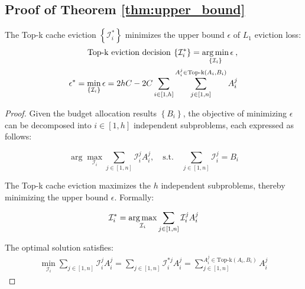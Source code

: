 \subsection{Proof of Theorem \ref{thm:upper_bound}}
\label{apdx:proof_upper_bound}
\begin{theorem}
	 The Top-k cache eviction $\left\{ \mathcal{I}^*_i \right\}$ minimizes the upper bound $\epsilon$ of $L_1$ eviction loss:
	{
		\begin{align}
			\text{Top-k eviction decision} \:	\left\{ \mathcal{I}^*_i \right\} = \operatorname*{arg\,min}_{\left\{ \mathcal{I}_i \right\}} \epsilon  \: ,\\ \epsilon^*= \min_{\left\{ \mathcal{I}_i \right\}} \epsilon = 2hC - 2C\sum_{i\in [1, h]}\sum_{j \in [1,n]}^{A_i^j \in \text{Top-k}(A_i,B_i)} A_i^j 
		\end{align}
	}
\end{theorem}
\begin{proof}
	Given the budget allocation results $\left\{B_i\right\}$, the objective of minimizing $\epsilon$ can be decomposed into $i \in [1, h]$ independent subproblems, each expressed as follows:
	
	\begin{equation}
		\arg\max_{\mathcal{I}_i} \sum_{j \in [1,n]} \mathcal{I}_i^j A_i^j, \quad \text{s.t.} \quad \sum_{j \in [1,n]} \mathcal{I}_i^j = B_i
	\end{equation}
	
	The Top-k cache eviction maximizes the $h$ independent subproblems, thereby minimizing the upper bound $\epsilon$. Formally:
	
	\begin{align}
		\mathcal{I}_i^*	=	\operatorname*{arg\,max}_{ \mathcal{I}_i} \sum_{j \in [1,n]} \mathcal{I}_i^j A_i^j \end{align}
	
	The optimal solution satisfies:
	\begin{align}
		\min_{\mathcal{I}_i} \sum_{j \in [1,n]} \mathcal{I}_i^{j} A_i^j = \sum_{j \in [1,n]} \mathcal{I}_i^{*j} A_i^j = \sum_{j \in [1,n]}^{A_i^j \in \text{Top-k}(A_i,B_i)} A_i^j 
	\end{align}
\end{proof}

